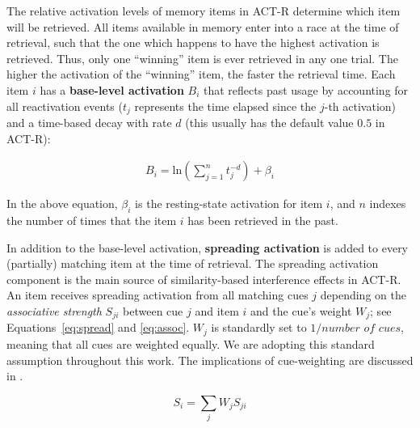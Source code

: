 \documentclass{cambridge7A}\usepackage[]{graphicx}\usepackage[]{color}
\newcommand{\revFE}[1]{#1}
\begin{document}
The relative activation levels of memory items in ACT-R determine which item will be retrieved. All items available in memory enter into a race at the time of retrieval, such that the one which happens to have the highest activation is retrieved. Thus, only one ``winning'' item is ever retrieved in any one trial. The higher the activation of the ``winning'' item, the faster the retrieval time.  Each item $i$ has a  \textbf{base-level activation} $B_i$  that reflects past usage by accounting for all reactivation events ($t_j$ represents the time elapsed since the $j$-th activation) and a time-based decay with rate $d$ (this usually has the default value $0.5$ in ACT-R):

\begin{eqnarray}
  B_i = \text{ln}(\sum_{j=1}^n t_j^{-d}) + \beta_i \label{eq:bl}
\end{eqnarray}

\noindent
In the above equation, $\beta_i$ is the resting-state activation for item $i$, and $n$ indexes the number of times that the item $i$ has been retrieved in the past.

In addition to the base-level activation,  \textbf{spreading activation} is added to every (partially) matching item at the time of retrieval. The spreading activation component is the main source of similarity-based interference effects in ACT-R. 
An item receives spreading activation from all matching cues $j$ depending on the  \emph{associative strength} $S_{ji}$ between cue $j$ and item $i$ and the cue's weight $W_{j}$; see Equations~\ref{eq:spread} and \ref{eq:assoc}. $W_j$ is standardly set to \revFE{$1/\textit{number of cues}$}, meaning that all cues are weighted equally. We are adopting this standard assumption throughout this work.  The implications of cue-weighting are discussed in \citep{VasishthEtAlTiCS2019,JaegerMertzenVanDykeVasishth2019}. 

\begin{equation}
      S_i = \sum_j W_{j} S_{ji} \label{eq:spread}
\end{equation}
\end{document}

